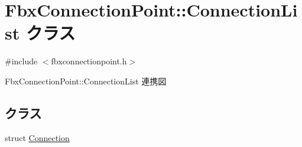 \hypertarget{class_fbx_connection_point_1_1_connection_list}{}\section{Fbx\+Connection\+Point\+:\+:Connection\+List クラス}
\label{class_fbx_connection_point_1_1_connection_list}


{\ttfamily \#include $<$fbxconnectionpoint.\+h$>$}



Fbx\+Connection\+Point\+:\+:Connection\+List 連携図
\subsection*{クラス}
\begin{DoxyCompactItemize}
\item 
struct \hyperlink{struct_fbx_connection_point_1_1_connection_list_1_1_connection}{Connection}
\end{DoxyCompactItemize}
